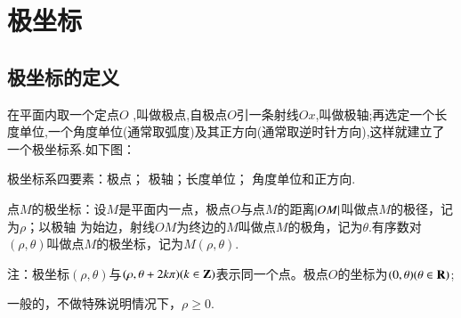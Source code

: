 \documentclass{BHCexam}
\begin{document}
\fubiaoti{}
\maketitle
\tableofcontents
\section{极坐标}
\subsection{极坐标的定义}
在平面内取一个定点$ O $ ,叫做极点,自极点$ O $引一条射线$ Ox $,叫做极轴;再选定一个长度单位,一个角度单位(通常取弧度)及其正方向(通常取逆时针方向),这样就建立了一个极坐标系.如下图：
\begin{center}
\end{center}
{\kaishu
极坐标系四要素：极点；\quad {} 极轴；\quad {}长度单位；\quad {} 角度单位和正方向.}\par 
点$M$的极坐标：设$ M $是平面内一点，极点$ O $与点$ M $的距离$ \left| OM \right| $叫做点$ M $的极径，记为$ \rho $；以极轴 为始边，射线$ OM $为终边的$ M $叫做点$ M $的极角，记为$ \theta $.有序数对$ (\rho,\theta) $叫做点$ M $的极坐标，记为$ M(\rho,\theta) $. \par
{\kaishu 注：极坐标$ (\rho,\theta) $与$ (\rho,\theta+2k\pi)(k\in\mathbf{Z}) $表示同一个点。极点$ O $的坐标为$ (0,\theta)(\theta\in\mathbf{R}) $;\par
{}一般的，不做特殊说明情况下，$ \rho\ge0 $.}
\end{document}
